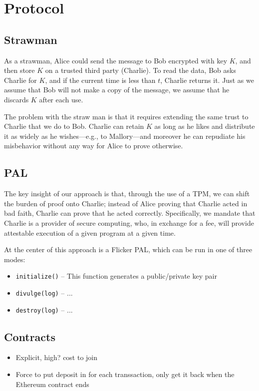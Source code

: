 \documentclass{article}
\begin{document}
\section{Protocol}

\subsection{Strawman}

As a strawman, Alice could send the message to Bob encrypted with key $K$, and then store $K$ on a trusted third party (Charlie). To read the data, Bob asks Charlie for $K$, and if the current time is less than $t$, Charlie returns it. Just as we assume that Bob will not make a copy of the message, we assume that he discards $K$ after each use.

The problem with the straw man is that it requires extending the same trust to Charlie that we do to Bob. Charlie can retain $K$ as long as he likes and distribute it as widely as he wishes---e.g., to Mallory---and moreover he can repudiate his misbehavior without any way for Alice to prove otherwise.

\subsection{PAL}

The key insight of our approach is that, through the use of a TPM, we can shift the burden of proof onto Charlie; instead of Alice proving that Charlie acted in bad faith, Charlie can prove that he acted correctly. Specifically, we mandate that Charlie is a provider of secure computing, who, in exchange for a fee, will provide attestable execution of a given program at a given time.

At the center of this approach is a Flicker PAL, which can be run in one of three modes:

\begin{itemize}
\item \texttt{initialize()} -- This function generates a public/private key pair
\item \texttt{divulge(log)} -- ...
\item \texttt{destroy(log)} -- ...
\end{itemize}

\subsection{Contracts}

\begin{itemize}
\item Explicit, high? cost to join
\item Force to put deposit in for each transsaction, only get it back when the Ethereum contract ends
\end{itemize}
\end{document}
